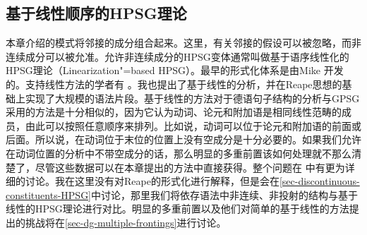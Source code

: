 \subsection{基于线性顺序的HPSG理论}
\label{sec-linearization-HPSG}

本章介绍的模式将邻接的成分组合起来。这里，有关邻接的假设可以被忽略，而非连续成分可以被允准。允许非连续成分的HPSG变体通常叫做基于语序线性化的HPSG理论（Linearization"=based HPSG）。最早的形式化体系是由Mike  \citet{Reape91,Reape92a,Reape94a}开发的。支持线性方法的学者有 \citet{Kathol95a,Kathol2000a,DS99a,RS99a,Crysmann2003c,BS2004a,Sato:06cluk,Wetta2011a}。我也提出了基于线性的分析\citep{Mueller99a,Mueller2002b}，并在Reape思想的基础上实现了大规模的语法片段\citep{Babel}。基于线性的方法对于德语句子结构的分析与GPSG采用的方法是十分相似的，因为它认为动词、论元和附加语是相同线性范畴的成员，由此可以按照任意顺序来排列。比如说，动词可以位于论元和附加语的前面或后面。所以说，在动词位于末位的位置上没有空成分是十分必要的。如果我们允许在动词位置的分析中不带空成分的话，那么明显的多重前置该如何处理就不那么清楚了，尽管这些数据可以在本章提出的方法中直接获得。整个问题在 中有更为详细的讨论。我在这里没有对Reape的形式化进行解释，但是会在\ref{sec-discontinuous-constituents-HPSG}中讨论，那里我们将依存语法中非连续、非投射的结构与基于线性的HPSG理论进行对比。明显的多重前置以及他们对简单的基于线性的方法提出的挑战将在\ref{sec-dg-multiple-frontings}进行讨论。
